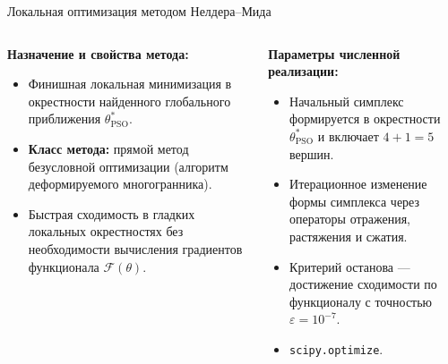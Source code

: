 \begin{frame}{Локальная оптимизация методом Нелдера--Мида}
	\vfill
	
	\begin{columns}[T]
		
		\begin{column}{0.49\textwidth}
			\textbf{Назначение и свойства метода:}
			\begin{tcolorbox}[
				colframe=DeepBlue!35, 
				colback=DeepBlue!1!Ivory, 
				coltext=DeepBlue, 
				boxrule=0.5pt, arc=3pt, 
				top=4pt, bottom=4pt, left=4pt, right=4pt,
				before=\vspace{3pt}, after=\vspace{0pt},
				equal height group=neldermeadstrict
				]
				\footnotesize
				\begin{itemize}
					\setlength{\itemsep}{5pt}
					\item Финишная локальная минимизация в окрестности найденного глобального приближения $\theta_{\text{PSO}}^*$.
					\item \textbf{Класс метода:} прямой метод безусловной оптимизации (алгоритм деформируемого многогранника).
					\item Быстрая сходимость в гладких локальных окрестностях без необходимости вычисления градиентов функционала $\mathcal{F}(\theta)$.
				\end{itemize}
			\end{tcolorbox}
		\end{column}
		
		\begin{column}{0.49\textwidth}
			\textbf{Параметры численной реализации:}
			\begin{tcolorbox}[
				colframe=Burgundy!35, 
				colback=Burgundy!1!Ivory, 
				coltext=DeepBlue, 
				boxrule=0.5pt, arc=3pt, 
				top=4pt, bottom=4pt, left=4pt, right=4pt,
				before=\vspace{3pt}, after=\vspace{0pt},
				equal height group=neldermeadstrict
				]
				\footnotesize
				\begin{itemize}
					\setlength{\itemsep}{5pt}
					\item Начальный симплекс формируется в окрестности $\theta_{\text{PSO}}^*$ и включает $4+1 = 5$ вершин.
					\item Итерационное изменение формы симплекса через операторы отражения, растяжения и сжатия.
					\item Критерий останова — достижение сходимости по функционалу с точностью $\varepsilon = 10^{-7}$.
					\item \texttt{scipy.optimize}.
				\end{itemize}
			\end{tcolorbox}
		\end{column}
		
	\end{columns}
	
	\vfill
\end{frame}